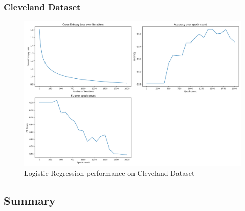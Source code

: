 \documentclass[letterpaper]{article}
\begin{document}
\subsubsection*{Cleveland Dataset}

\begin{figure}[H]
	\includegraphics[width=\textwidth]{figures/logistics_cleveland.csv.png}
	\caption{Logistic Regression performance on Cleveland Dataset}
	\label{fig:logistics-cleveland}
\end{figure}
\newpage
\subsection*{Summary}
\end{document}
